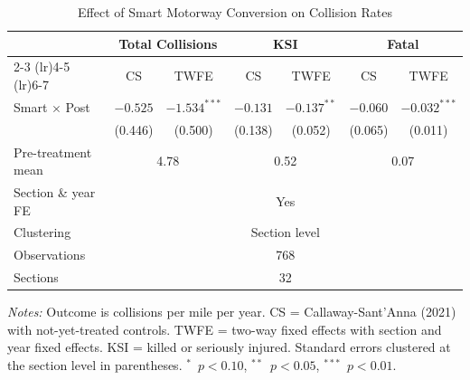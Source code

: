 \begin{table}[htbp]
\centering
\caption{Effect of Smart Motorway Conversion on Collision Rates}
\label{tab:main_results}
\small
\begin{tabular}{lcccccc}
\toprule
 & \multicolumn{2}{c}{Total Collisions} & \multicolumn{2}{c}{KSI} & \multicolumn{2}{c}{Fatal} \\
\cmidrule(lr){2-3} \cmidrule(lr){4-5} \cmidrule(lr){6-7}
 & CS & TWFE & CS & TWFE & CS & TWFE \\
\midrule
  Smart $\times$ Post & $-0.525$ & $-1.534^{***}$ & $-0.131$ & $-0.137^{**}$ & $-0.060$ & $-0.032^{***}$ \\
   & (0.446) & (0.500) & (0.138) & (0.052) & (0.065) & (0.011) \\
  \midrule
  Pre-treatment mean & \multicolumn{2}{c}{4.78} & \multicolumn{2}{c}{0.52} & \multicolumn{2}{c}{0.07} \\
  Section \& year FE & \multicolumn{6}{c}{Yes} \\
  Clustering & \multicolumn{6}{c}{Section level} \\
  Observations & \multicolumn{6}{c}{768} \\
  Sections & \multicolumn{6}{c}{32} \\
\bottomrule
\end{tabular}
\begin{tablenotes}
\item \textit{Notes:} Outcome is collisions per mile per year. CS = Callaway-Sant'Anna (2021) with not-yet-treated controls. TWFE = two-way fixed effects with section and year fixed effects. KSI = killed or seriously injured. Standard errors clustered at the section level in parentheses. $^{*}$~$p<0.10$, $^{**}$~$p<0.05$, $^{***}$~$p<0.01$.
\end{tablenotes}
\end{table}
